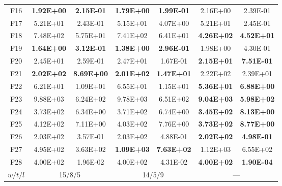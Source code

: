 \begin{table*}[!ht]
\begin{tabular}{|c|cc|cc|cc|}
    F16   & \textbf{1.92E+00} & \textbf{2.15E-01} & \textbf{1.79E+00} & \textbf{1.99E-01} & 2.16E+00 & 2.39E-01 \\
    F17   & 5.21E+01 & 2.43E-01 & 5.15E+01 & 4.07E+00 & 5.21E+01 & 2.45E-01 \\
    F18   & 7.48E+02 & 5.75E+01 & 7.41E+02 & 6.41E+01 & \textbf{4.26E+02} & \textbf{4.52E+01} \\
    F19   & \textbf{1.64E+00} & \textbf{3.12E-01} & \textbf{1.38E+00} & \textbf{2.96E-01} & 1.98E+00 & 4.30E-01 \\
    F20   & 2.45E+01 & 2.59E-01 & 2.47E+01 & 1.67E-01 & \textbf{2.15E+01} & \textbf{7.51E-01} \\
    \hline
    F21   & \textbf{2.02E+02} & \textbf{8.69E+00} & \textbf{2.01E+02} & \textbf{1.47E+01} & 2.22E+02 & 2.39E+01 \\
    F22   & 6.21E+01 & 1.09E+01 & 6.55E+01 & 1.15E+01 & \textbf{5.36E+01} & \textbf{6.88E+00} \\
    F23   & 9.88E+03 & 6.24E+02 & 9.78E+03 & 6.51E+02 & \textbf{9.04E+03} & \textbf{5.98E+02} \\
    F24   & 3.73E+02 & 6.34E+00 & 3.71E+02 & 6.74E+00 & \textbf{3.45E+02} & \textbf{8.13E+00} \\
    F25   & 4.12E+02 & 7.11E+00 & 4.03E+02 & 7.76E+00 & \textbf{3.73E+02} & \textbf{8.77E+00} \\
    F26   & 2.03E+02 & 3.57E-01 & 2.03E+02 & 4.88E-01 & \textbf{2.02E+02} & \textbf{4.98E-01} \\
    F27   & 4.95E+02 & 3.63E+02 & \textbf{1.09E+03} & \textbf{7.63E+02} & 1.12E+03 & 6.55E+02 \\
    F28   & 4.00E+02 & 1.96E-02 & 4.00E+02 & 4.31E-02 & \textbf{4.00E+02} & \textbf{1.90E-04} \\
    \hline
    $w/t/l$ & \multicolumn{2}{c|}{15/8/5} & \multicolumn{2}{c|}{14/5/9} & \multicolumn{2}{c|}{---} \\
    \hline
    \end{tabular}%
  \label{tab:AG_CEC13_origin50D}%
\end{table*}%

